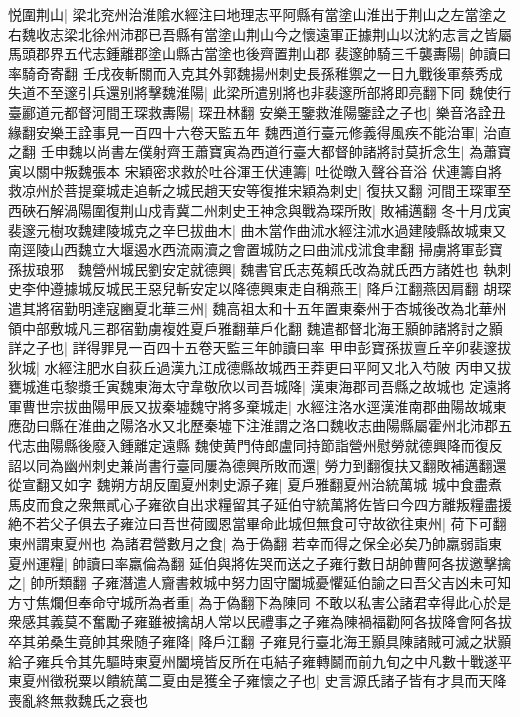 悦圍荆山|{
	梁北兖州治淮隂水經注曰地理志平阿縣有當塗山淮出于荆山之左當塗之右魏收志梁北徐州沛郡已吾縣有當塗山荆山今之懷遠軍正據荆山以沈約志言之皆屬馬頭郡界五代志鍾離郡塗山縣古當塗也後齊置荆山郡}
裴邃帥騎三千襲夀陽|{
	帥讀曰率騎奇寄翻}
壬戌夜斬關而入克其外郭魏揚州刺史長孫稚禦之一日九戰後軍蔡秀成失道不至邃引兵還别將擊魏淮陽|{
	此梁所遣别將也非裴邃所部將即亮翻下同}
魏使行臺酈道元都督河間王琛救夀陽|{
	琛丑林翻}
安樂王鑒救淮陽鑒詮之子也|{
	樂音洛詮丑緣翻安樂王詮事見一百四十六卷天監五年}
魏西道行臺元修義得風疾不能治軍|{
	治直之翻}
壬申魏以尚書左僕射齊王蕭寶寅為西道行臺大都督帥諸將討莫折念生|{
	為蕭寶寅以關中叛魏張本}
宋穎密求救於吐谷渾王伏連籌|{
	吐從暾入聲谷音浴}
伏連籌自將救凉州於菩提棄城走追斬之城民趙天安等復推宋穎為刺史|{
	復扶又翻}
河間王琛軍至西硤石解渦陽圍復荆山戍青冀二州刺史王神念與戰為琛所敗|{
	敗補邁翻}
冬十月戊寅裴邃元樹攻魏建陵城克之辛巳拔曲木|{
	曲木當作曲沭水經注沭水過建陵縣故城東又南逕陵山西魏立大堰遏水西流兩瀆之會置城防之曰曲沭戍沭食聿翻}
掃虜將軍彭寶孫拔琅邪　魏營州城民劉安定就德興|{
	魏書官氏志菟賴氏改為就氏西方諸姓也}
執刺史李仲遵據城反城民王惡兒斬安定以降德興東走自稱燕王|{
	降戶江翻燕因肩翻}
胡琛遣其將宿勤明達寇豳夏北華三州|{
	魏高祖太和十五年置東秦州于杏城後改為北華州領中部敷城凡三郡宿勤虜複姓夏戶雅翻華戶化翻}
魏遣都督北海王顥帥諸將討之顥詳之子也|{
	詳得罪見一百四十五卷天監三年帥讀曰率}
甲申彭寶孫拔亶丘辛卯裴邃拔狄城|{
	水經注肥水自荻丘過漢九江成德縣故城西王莽更曰平阿又北入芍陂}
丙申又拔甕城進屯黎漿壬寅魏東海太守韋敬欣以司吾城降|{
	漢東海郡司吾縣之故城也}
定遠將軍曹世宗拔曲陽甲辰又拔秦墟魏守將多棄城走|{
	水經注洛水逕漢淮南郡曲陽故城東應劭曰縣在淮曲之陽洛水又北歷秦墟下注淮謂之洛口魏收志曲陽縣屬霍州北沛郡五代志曲陽縣後廢入鍾離定遠縣}
魏使黄門侍郎盧同持節詣營州慰勞就德興降而復反詔以同為幽州刺史兼尚書行臺同屢為德興所敗而還|{
	勞力到翻復扶又翻敗補邁翻還從宣翻又如字}
魏朔方胡反圍夏州刺史源子雍|{
	夏戶雅翻夏州治統萬城}
城中食盡煮馬皮而食之衆無貳心子雍欲自出求糧留其子延伯守統萬將佐皆曰今四方離叛糧盡援絶不若父子俱去子雍泣曰吾世荷國恩當畢命此城但無食可守故欲往東州|{
	荷下可翻東州謂東夏州也}
為諸君營數月之食|{
	為于偽翻}
若幸而得之保全必矣乃帥羸弱詣東夏州運糧|{
	帥讀曰率羸倫為翻}
延伯與將佐哭而送之子雍行數日胡帥曹阿各拔邀擊擒之|{
	帥所類翻}
子雍潛遣人齎書敕城中努力固守闔城憂懼延伯諭之曰吾父吉凶未可知方寸焦爛但奉命守城所為者重|{
	為于偽翻下為陳同}
不敢以私害公諸君幸得此心於是衆感其義莫不奮勵子雍雖被擒胡人常以民禮事之子雍為陳禍福勸阿各拔降會阿各拔卒其弟桑生竟帥其衆随子雍降|{
	降戶江翻}
子雍見行臺北海王顥具陳諸賊可滅之狀顥給子雍兵令其先驅時東夏州闔境皆反所在屯結子雍轉鬬而前九旬之中凡數十戰遂平東夏州徵税粟以饋統萬二夏由是獲全子雍懷之子也|{
	史言源氏諸子皆有才具而天降喪亂終無救魏氏之衰也}
